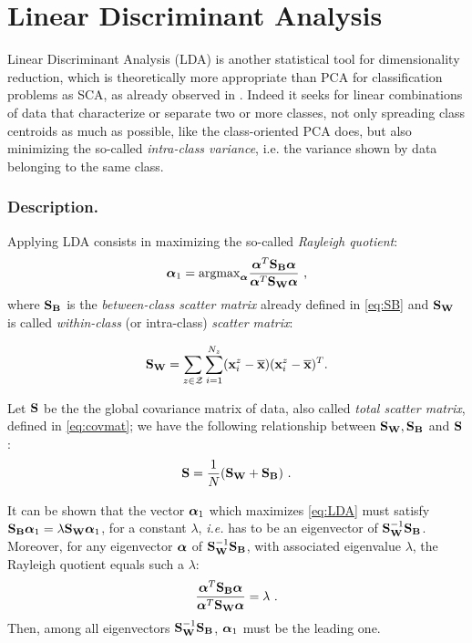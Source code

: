 \section{Linear Discriminant Analysis}\label{sec:LDA}

Linear Discriminant Analysis (LDA) is another statistical tool for dimensionality reduction, which is theoretically more appropriate than PCA for classification problems as SCA, as already observed in \cite{Standaert2008}. Indeed it seeks for linear combinations of data that characterize or separate two or more classes, not only spreading class centroids as much as possible, like the class-oriented PCA does, but also minimizing the so-called {\em intra-class variance}, i.e. the variance shown by data belonging to the same class.\\

\subsubsection{Description.} Applying LDA consists in maximizing the so-called {\em Rayleigh quotient}:
 \begin{equation}\label{eq:LDA}
 \AAlpha_1=\mathrm{argmax}_{\AAlpha} \frac{\AAlpha^T \SB \AAlpha}{\AAlpha^T \SW \AAlpha} \mbox{ ,}
 \end{equation}
where $\SB$ is the {\em between-class scatter matrix} already defined in \eqref{eq:SB} and $\SW$ is called 
{\em within-class} (or intra-class) {\em scatter matrix}:

\begin{equation}
\SW = \sum_{\sensVar\in\sensVarSet}\sum_{i=1}^{\numTraces}(\sss{i}-\mmmX)(\sss{i}-\mmmX)^T \mbox{.}
\end{equation}


\begin{remark}
Let $\covmat$ be the the global covariance matrix of data, also called {\em total scatter matrix}, defined in \eqref{eq:covmat}; we have the following relationship between $\SW,\SB$ and $\covmat$:
\begin{equation}
\covmat = \frac{1}{\numTraces[]}(\SW + \SB) \mbox{ .}
\end{equation}
\end{remark}

It can be shown that the vector $\AAlpha_1$ which maximizes \eqref{eq:LDA} must satisfy $\SB\AAlpha_1 = \lambda \SW \AAlpha_1$, for a constant $\lambda$, \textit{i.e.} has to be an eigenvector of $\SW^{-1} \SB$. Moreover, for any eigenvector $\AAlpha$ of $\SW^{-1}\SB$, with associated eigenvalue $\lambda$, the Rayleigh quotient equals such a $\lambda$:
\begin{equation}\label{eq:lambdas}
\frac{\AAlpha^T \SB \AAlpha}{\AAlpha^T \SW \AAlpha} = \lambda \mbox{ .}
\end{equation}
Then, among all eigenvectors $\SW^{-1} \SB$, $\AAlpha_1$ must be the leading one.\\

